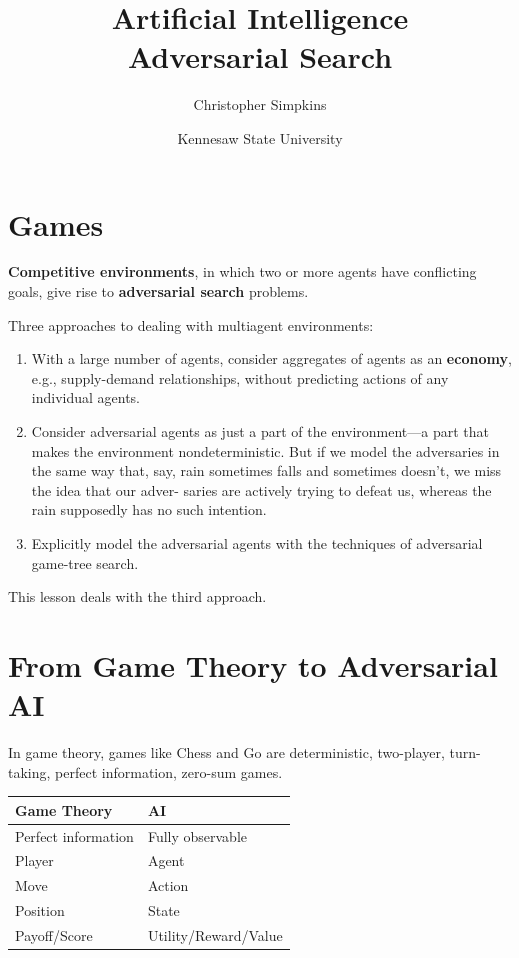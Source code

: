 \documentclass[11pt]{article}
\author{Christopher Simpkins}
\date{Kennesaw State University}
\title{Artificial Intelligence\\\medskip
\large Adversarial Search}
\begin{document}
\maketitle
\section{Games}
\label{sec:org5b8a295}

\textbf{Competitive environments}, in which two or more agents have conflicting goals, give rise to \textbf{adversarial search} problems.

Three approaches to dealing with multiagent environments:

\begin{enumerate}
\item With a large number of agents, consider aggregates of agents as an \textbf{economy}, e.g., supply-demand relationships, without predicting actions of any individual agents.

\item Consider adversarial agents as just a part of the environment—a part that makes the environment nondeterministic. But if we model the adversaries in the same way that, say, rain sometimes falls and sometimes doesn’t, we miss the idea that our adver- saries are actively trying to defeat us, whereas the rain supposedly has no such intention.

\item Explicitly model the adversarial agents with the techniques of adversarial game-tree search.
\end{enumerate}

This lesson deals with the third approach.
\section{From Game Theory to Adversarial AI}
\label{sec:org3c571be}

In game theory, games like Chess and Go are deterministic, two-player, turn-taking, perfect information, zero-sum games.

\begin{center}
\begin{tabular}{ll}
Game Theory & AI\\
\hline
Perfect information & Fully observable\\
Player & Agent\\
Move & Action\\
Position & State\\
Payoff/Score & Utility/Reward/Value\\
\end{tabular}
\end{center}
\end{document}
